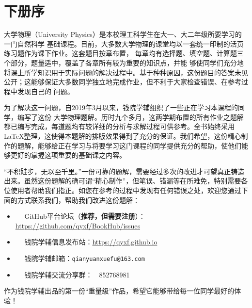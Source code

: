 \maketitle
\pagestyle{plain}
\chapter*{下册序}
大学物理（University Physics）是本校理工科学生在大一、大二年级所要学习的一门自然科学
基础课程。目前，大多数大学物理的课堂均以一套统一印制的活页练习题作为课下作业。这套题目按章布置，
每章均有选择题、填空题、计算题三个部分，题量适中，覆盖了各章所有较为重要的知识点，并能
够使同学们充分地将课上所学知识用于实际问题的解决过程中。基于种种原因，这份题目的答案未见
公开；这能够保证大多数同学独立地完成作业，但不利于大家检查错误、在参考过程中发现自己的
问题。

为了解决这一问题，自2019年3月以来，钱院学辅组织了一些正在学习本课程的同学，编写了这份
大学物理题解。历时九个多月，这两学期布置的所有作业之题解都已编写完成，每道题均有较详细的分析与求解过程可供参考。全书始终采用\LaTeX 整理，这使得本题解的排版效果得到了充分的保证。我们希望，这份精心制作的题解，能够给正在学习与将要学习这门课程的同学提供充分的帮助，使他们能够更好的掌握这项重要的基础课之内容。

“不积跬步，无以至千里。”一份可靠的题解，需要经过多次的改进才可望真正铸造出来。虽然这份题解的确可谓“精心制作”，但笔误、错漏等在所难免，特别需要各位使用者帮助我们指正。如您在参考的过程中发现有任何错误之处，欢迎您通过下面的方式联系我们，帮助我们改进这份题解：
\begin{itemize}
	\item \faGithub ~~ GitHub平台论坛（\textbf{推荐，但需要注册}）：\url{https://github.com/qyxf/BookHub/issues}
	\item \faInternetExplorer ~~ 钱院学辅信息发布站：\url{https://qyxf.github.io}
	\item \faEnvelopeOpen ~~ 钱院学辅邮箱：\texttt{qianyuanxuefu@163.com}
	\item \faQq ~~ 钱院学辅交流分享群：~~852768981
\end{itemize}

作为钱院学辅出品的第一份“重量级”作品，希望它能够带给每一位同学最好的体验！

